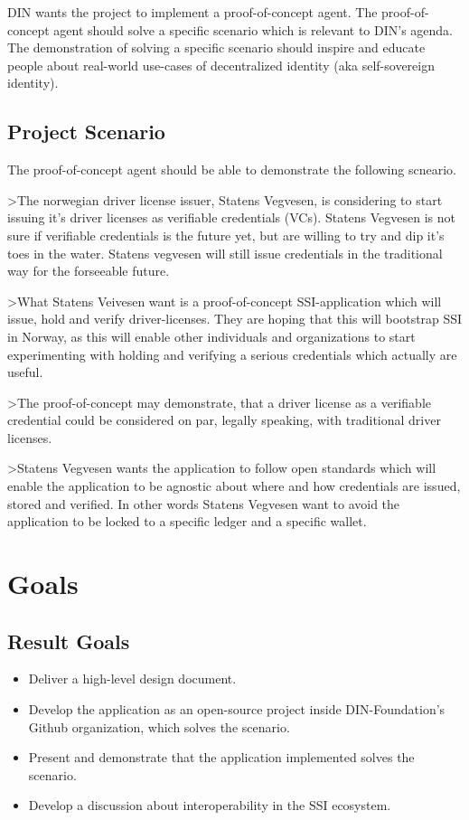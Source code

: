 DIN wants the project to implement a proof-of-concept agent. The proof-of-concept agent should solve a specific scenario which is relevant to DIN's agenda. The demonstration of solving a specific scenario should inspire and educate people about real-world use-cases of decentralized identity (aka self-sovereign identity).

\subsection{Project Scenario}

The proof-of-concept agent should be able to demonstrate the following scneario.

>The norwegian driver license issuer, Statens Vegvesen, is considering to start issuing it's driver licenses as verifiable credentials (VCs). Statens Vegvesen is not sure if verifiable credentials is the future yet, but are willing to try and dip it's toes in the water. Statens vegvesen will still issue credentials in the traditional way for the forseeable future.

>What Statens Veivesen want is a proof-of-concept SSI-application which will issue, hold and verify driver-licenses. They are hoping that this will bootstrap SSI in Norway, as this will enable other individuals and organizations to start experimenting with holding and verifying a serious credentials which actually are useful.

>The proof-of-concept may demonstrate, that a driver license as a verifiable credential could be considered on par, legally speaking, with traditional driver licenses.

>Statens Vegvesen wants the application to follow open standards which will enable the application to be agnostic about where and how credentials are issued, stored and verified. In other words Statens Vegvesen want to avoid the application to be locked to a specific ledger and a specific wallet.




\section{Goals}

\subsection{Result Goals}

\begin{itemize}
\item Deliver a high-level design document.
\item Develop the application as an open-source project inside DIN-Foundation's Github organization, which solves the scenario.
\item Present and demonstrate that the application implemented solves the scenario.
\item Develop a discussion about interoperability in the SSI ecosystem.
\end{itemize}

